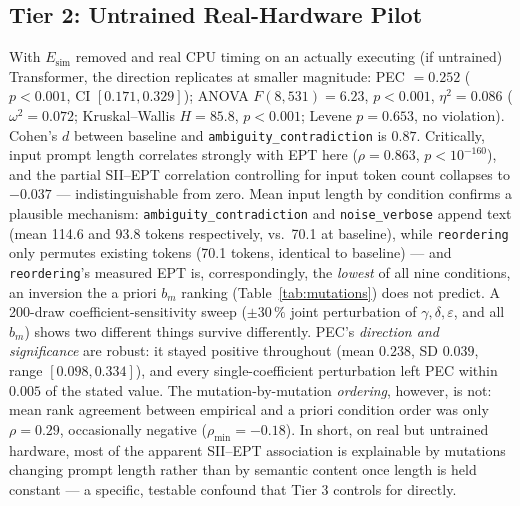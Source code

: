 \documentclass[conference]{IEEEtran}
\begin{document}
\subsection{Tier 2: Untrained Real-Hardware Pilot}
\label{sec:results-stage2}
With $E_\text{sim}$ removed and real CPU timing on an actually
executing (if untrained) Transformer, the direction replicates at
smaller magnitude: PEC $=0.252$ ($p<0.001$, CI $[0.171,0.329]$); ANOVA
$F(8,531)=6.23$, $p<0.001$, $\eta^2=0.086$ ($\omega^2=0.072$;
Kruskal--Wallis $H=85.8$, $p<0.001$; Levene $p=0.653$, no violation).
Cohen's $d$ between baseline and \texttt{ambiguity\_contradiction} is
$0.87$. Critically, input prompt length correlates strongly with EPT
here ($\rho=0.863$, $p<10^{-160}$), and the partial SII--EPT
correlation controlling for input token count collapses to
$-0.037$ --- indistinguishable from zero. Mean input length by
condition confirms a plausible mechanism: \texttt{ambiguity\_contradiction}
and \texttt{noise\_verbose} append text (mean 114.6 and 93.8 tokens
respectively, vs.\ 70.1 at baseline), while \texttt{reordering} only
permutes existing tokens (70.1 tokens, identical to baseline) --- and
\texttt{reordering}'s measured EPT is, correspondingly, the
\emph{lowest} of all nine conditions, an inversion the a priori $b_m$
ranking (Table~\ref{tab:mutations}) does not predict.
A 200-draw coefficient-sensitivity sweep ($\pm30\,\%$ joint
perturbation of $\gamma,\delta,\varepsilon$, and all $b_m$) shows two
different things survive differently. PEC's \emph{direction and
significance} are robust: it stayed positive throughout (mean
$0.238$, SD $0.039$, range $[0.098,0.334]$), and every single-coefficient
perturbation left PEC within $0.005$ of the stated value. The
mutation-by-mutation \emph{ordering}, however, is not: mean rank
agreement between empirical and a priori condition order was only
$\rho=0.29$, occasionally negative ($\rho_\text{min}=-0.18$). In
short, on real but untrained hardware, most of the apparent
SII--EPT association is explainable by mutations changing prompt
length rather than by semantic content once length is held constant
--- a specific, testable confound that Tier 3 controls for directly.
\end{document}
